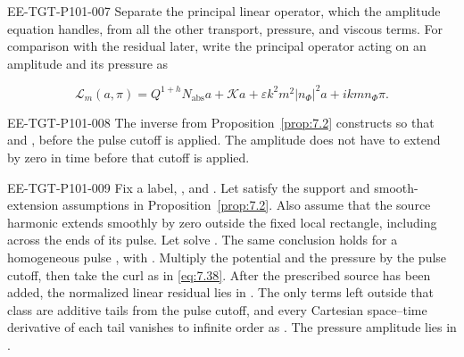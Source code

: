 \begin{EESegment}{EE-TGT-P101-007}
Separate the principal linear operator, which the amplitude equation handles, from all the other
transport, pressure, and viscous terms. For comparison with the residual later, write the principal
operator acting on an amplitude and its pressure as
\end{EESegment}
\begin{equation}
\mathscr L_m(a,\pi)=Q^{1+h}N_{\mathrm{abs}}a+\mathcal Ka
+\varepsilon k^2m^2|n_\Phi|^2a+ikmn_\Phi\pi.
\tag{9.1}\label{eq:9.1}
\end{equation}
\begin{EESegment}{EE-TGT-P101-008}
The inverse from Proposition~\ref{prop:7.2} constructs
 so that
 and
, before the pulse cutoff is applied. The amplitude
 does not have to extend by zero in time before that cutoff is applied.
\end{EESegment}

\begin{proposition}\label{prop:9.1}
\begin{EESegment}{EE-TGT-P101-009}
Fix a label, , and
. Let 
satisfy the support and smooth-extension assumptions in Proposition~\ref{prop:7.2}. Also assume
that the source harmonic  extends smoothly by zero outside the
fixed local rectangle, including across the ends of its pulse. Let
 solve
. The same conclusion holds for a homogeneous
pulse , with
. Multiply the potential and the pressure by the pulse cutoff, then take
the curl as in \eqref{eq:7.38}. After the prescribed source
 has been added, the normalized linear residual lies in
. The only terms left outside that class are
additive tails from the pulse cutoff, and every Cartesian space--time derivative of each tail
vanishes to infinite order as . The pressure amplitude
 lies in .
\end{EESegment}
\end{proposition}

